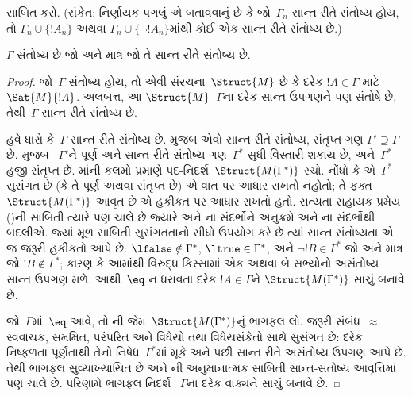 \begin{prob}
 સાબિત કરો. (સંકેત: નિર્ણાયક
પગલું એ બતાવવાનું છે કે જો~$\Gamma_n$ સાન્ત રીતે સંતોષ્ય હોય, તો
$\Gamma_n\cup\{!A_n\}$ અથવા $\Gamma_n\cup\{\lnot !A_n\}$માંથી કોઈ એક
સાન્ત રીતે સંતોષ્ય છે.)
\end{prob}



\begin{thm}[સઘનતા]
 $\Gamma$ સંતોષ્ય છે જો અને માત્ર જો તે
સાન્ત રીતે સંતોષ્ય છે.
\end{thm}

\begin{proof}
જો~$\Gamma$ સંતોષ્ય હોય, તો એવી
સંરચના~$\Struct{M}$
છે કે દરેક $!A\in\Gamma$ માટે
$\Sat{M}{!A}$. અલબત્ત, આ
$\Struct{M}$~$\Gamma$ના દરેક સાન્ત ઉપગણને
પણ સંતોષે છે, તેથી~$\Gamma$ સાન્ત રીતે સંતોષ્ય છે.

હવે ધારો કે~$\Gamma$ સાન્ત રીતે સંતોષ્ય છે.
   મુજબ એવો સાન્ત રીતે સંતોષ્ય, સંતૃપ્ત ગણ
  $\Gamma'\supseteq\Gamma$ છે.  મુજબ
~$\Gamma'$ને પૂર્ણ અને સાન્ત રીતે સંતોષ્ય
ગણ~$\Gamma^*$ સુધી વિસ્તારી શકાય છે, અને~$\Gamma^*$ હજી
સંતૃપ્ત છે. માંની કલમો પ્રમાણે
પદ-નિદર્શ~$\Struct{M(\Gamma^*)}$ રચો. નોંધો કે
 એ~$\Gamma^*$ સુસંગત છે (કે તે
પૂર્ણ અથવા સંતૃપ્ત છે) એ વાત પર આધાર રાખતો નહોતો; તે ફક્ત
$\Struct{M(\Gamma^*)}$ આવૃત છે એ હકીકત પર આધાર રાખતો હતો.
સત્યતા સહાયક પ્રમેય ()ની સાબિતી ત્યારે પણ ચાલે
છે જ્યારે  અને
ના સંદર્ભોને અનુક્રમે
 અને ના સંદર્ભોથી
બદલીએ. જ્યાં મૂળ સાબિતી
સુસંગતતાનો સીધો ઉપયોગ કરે છે ત્યાં સાન્ત સંતોષ્યતા એ જ જરૂરી હકીકતો
આપે છે: $\lfalse\notin\Gamma^*$, $\ltrue\in\Gamma^*$, અને
$\lnot !B\in\Gamma^*$ જો અને માત્ર જો $!B\notin\Gamma^*$; કારણ કે
આમાંથી વિરુદ્ધ કિસ્સામાં એક અથવા બે સભ્યોનો અસંતોષ્ય સાન્ત ઉપગણ મળે.
આથી~$\eq$ ન ધરાવતા દરેક $!A\in\Gamma$ને
$\Struct{M(\Gamma^*)}$ સાચું બનાવે છે.

જો~$\Gamma$માં~$\eq$ આવે, તો
ની જેમ~$\Struct{M(\Gamma^*)}$નું
ભાગફલ લો. જરૂરી સંબંધ~$\approx$ સ્વવાચક, સમમિત, પરંપરિત અને
વિધેયો તથા વિધેયસંકેતો સાથે સુસંગત છે: દરેક નિષ્ફળતા પૂર્ણતાથી તેનો
નિષેધ~$\Gamma^*$માં મૂકે અને પછી સાન્ત રીતે અસંતોષ્ય ઉપગણ આપે છે.
તેથી ભાગફલ સુવ્યાખ્યાયિત છે અને ની અનુમાનાત્મક
સાબિતી સાન્ત-સંતોષ્ય આવૃત્તિમાં પણ ચાલે છે. પરિણામે ભાગફલ નિદર્શ
~$\Gamma$ના દરેક વાક્યને સાચું બનાવે છે.
\end{proof}

